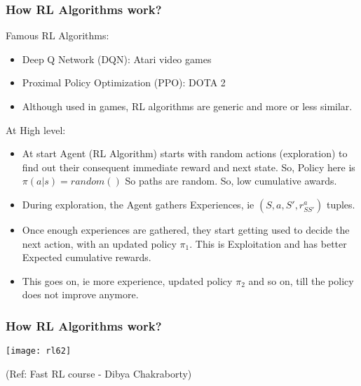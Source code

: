\begin{frame}[fragile]\frametitle{How RL Algorithms work?}

Famous RL Algorithms:
\begin{itemize}
\item Deep Q Network (DQN): Atari video games
\item Proximal Policy Optimization (PPO): DOTA 2
\item Although used in games, RL algorithms are generic and more or less similar.
\end{itemize}

At High level:
\begin{itemize}
\item At start Agent (RL Algorithm) starts with random actions (exploration) to find out their consequent immediate reward and next state. So, Policy here is $\pi(a|s) = random()$ So paths are random. So, low cumulative awards.
\item During exploration, the Agent gathers Experiences, ie $(S,a,S',r_{SS'}^a)$ tuples.
\item Once enough experiences are gathered, they start getting used to decide the next action, with an updated policy $\pi_1$. This is Exploitation and has better Expected cumulative rewards.
\item This goes on, ie more experience, updated policy $\pi_2$ and so on, till the policy does not improve anymore.
\end{itemize}
\end{frame}

\begin{frame}[fragile]\frametitle{How RL Algorithms work?}

\begin{center}
\texttt{[image: rl62]}

{\tiny (Ref: Fast RL course - Dibya Chakraborty)}
\end{center}

\end{frame}


